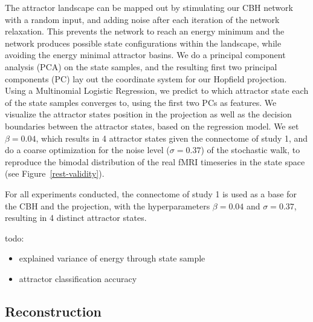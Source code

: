 \documentclass{article}
\begin{document}
The attractor landscape can be mapped out by stimulating our CBH network with a random input, and adding noise after
each iteration of the network relaxation. This prevents the network to reach an energy minimum and the network
produces possible state configurations within the landscape, while avoiding the energy minimal attractor basins.
We do a principal component analysis (PCA) on the state samples, and the resulting first two principal components (PC)
lay out the coordinate system for our Hopfield projection. Using a Multinomial Logistic Regression, we predict to which
attractor state each of the state samples converges to, using the first two PCs as features. We visualize the attractor
states position in the projection as well as the decision boundaries between the attractor states, based on the
regression model. We set $\beta = 0.04$, which results in 4 attractor states given the connectome of study 1, and do a
coarse optimization for the noise level ($\sigma=0.37$) of the stochastic walk, to reproduce the bimodal distribution
of the real fMRI timeseries in the state space (see Figure~\ref{rest-validity}).

For all experiments conducted, the connectome of study 1 is used as a base for the CBH and the projection, with the
hyperparameters $\beta = 0.04$ and $\sigma=0.37$, resulting in 4 distinct attractor states.

todo:

\begin{itemize}
\item explained variance of energy through state sample
\item attractor classification accuracy
\end{itemize}

\subsection{Reconstruction}\label{Reconstruction}
\end{document}
